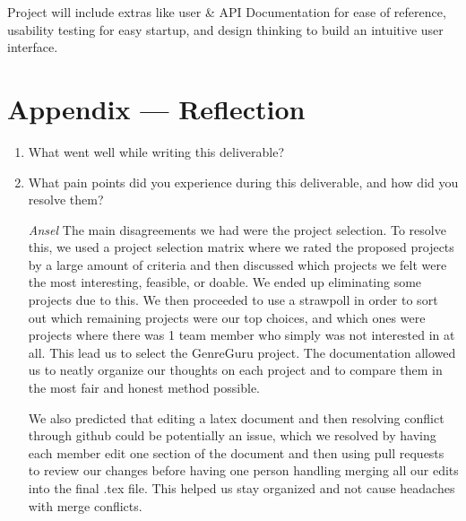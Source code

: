 \documentclass{article}
\begin{document}
\noindent
Project will include extras like user \& API Documentation for ease of reference, usability testing 
for easy startup, and design thinking to build an intuitive user interface.

\newpage{}

\section*{Appendix --- Reflection}




\begin{enumerate}
    \item What went well while writing this deliverable? 
    \item What pain points did you experience during this deliverable, and how
    did you resolve them?
    
\emph{Ansel}
The main disagreements we had were the project selection. To resolve this, we used a project selection matrix 
where we rated the proposed projects by a large amount of criteria and then discussed which projects we felt
were the most interesting, feasible, or doable. We ended up eliminating some projects due to this. We then proceeded to use a strawpoll in order to sort out which
remaining projects were our top choices, and which ones were projects where there was 1 team member who simply was not
interested in at all. This lead us to select the GenreGuru project. The documentation allowed us to neatly organize our
thoughts on each project and to compare them in the most fair and honest method possible. 

We also predicted that editing a latex
document and then resolving conflict through github could be potentially an issue, which we resolved by having each member 
edit one section of the document and then using pull requests to review our changes before having one person handling merging
all our edits into the final .tex file. This helped us stay organized and not cause headaches with merge conflicts. 


\end{enumerate}
\end{document}

